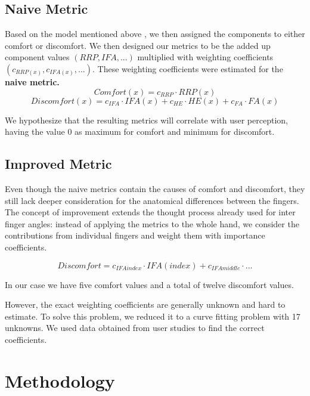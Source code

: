 \documentclass{sig-alternate-05-2015}
\begin{document}
\subsection{Naive Metric}


Based on the model mentioned above \cite{vink2012editorial}, we then assigned the components to either comfort or discomfort. We then designed our metrics to be the added up component values \begin{math}(RRP, IFA, ...)\end{math} multiplied with weighting coefficients \begin{math}(c_{RRP(x)}, c_{IFA(x)}, ...)\end{math}. These weighting coefficients were estimated for the \textbf{naive metric.} 
	\[
	Comfort(x) = c_{RRP}\cdot RRP(x)
	\]
	\[
	Discomfort(x) = c_{IFA}\cdot IFA(x)  +  c_{HE}\cdot HE(x)  +  c_{FA}\cdot FA(x)
	\]

We hypothesize that the resulting metrics will correlate with user perception, having the value 0 as maximum  for comfort and minimum for discomfort.

\subsection{Improved Metric}

Even though the naive metrics contain the causes of comfort and discomfort, they still lack deeper consideration for the anatomical differences between the fingers.
The concept of improvement extends the thought process already used for inter finger angles: instead of applying the metrics to the whole hand, we consider the contributions from individual fingers and weight them with importance coefficients. 

	\[
	Discomfort = c_{IFAindex}\cdot IFA(index)  +  c_{IFAmiddle}\cdot...
	\]

In our case we have five comfort values and a total of twelve discomfort values. 

However, the exact weighting coefficients are generally unknown and hard to estimate. To solve this problem, we reduced it to a curve fitting problem with 17 unknowns. We used data obtained from user studies to find the correct coefficients.

\section{Methodology}
\end{document}
